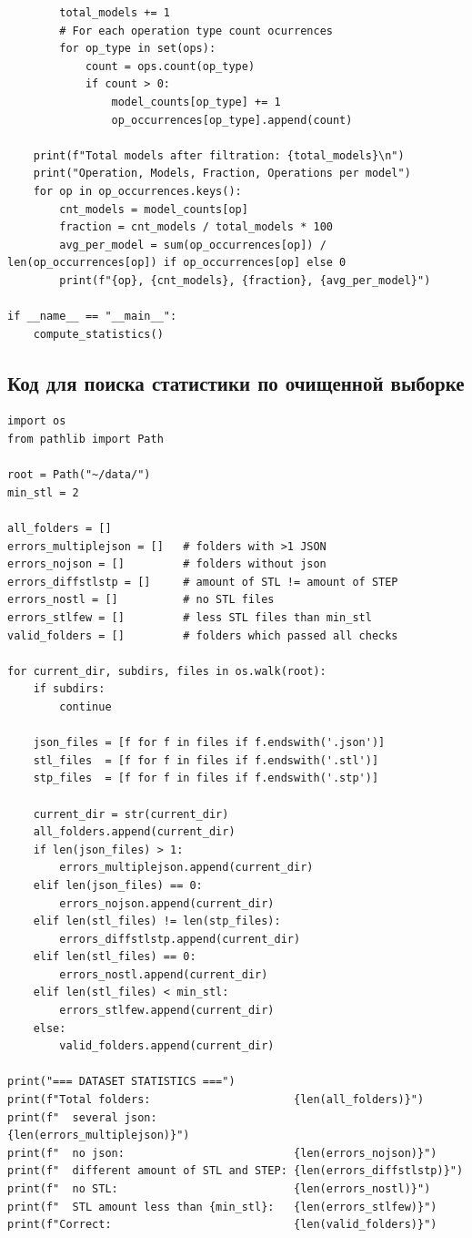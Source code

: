 \begin{lstlisting}
        total_models += 1
        # For each operation type count ocurrences
        for op_type in set(ops):
            count = ops.count(op_type)
            if count > 0:
                model_counts[op_type] += 1
                op_occurrences[op_type].append(count)
    
    print(f"Total models after filtration: {total_models}\n")
    print("Operation, Models, Fraction, Operations per model")
    for op in op_occurrences.keys():
        cnt_models = model_counts[op]
        fraction = cnt_models / total_models * 100
        avg_per_model = sum(op_occurrences[op]) / len(op_occurrences[op]) if op_occurrences[op] else 0
        print(f"{op}, {cnt_models}, {fraction}, {avg_per_model}")

if __name__ == "__main__":
    compute_statistics()
\end{lstlisting}



\subsection{Код для поиска статистики по очищенной выборке}

\begin{lstlisting}
import os
from pathlib import Path

root = Path("~/data/")
min_stl = 2

all_folders = []
errors_multiplejson = []   # folders with >1 JSON
errors_nojson = []         # folders without json
errors_diffstlstp = []     # amount of STL != amount of STEP
errors_nostl = []          # no STL files
errors_stlfew = []         # less STL files than min_stl
valid_folders = []         # folders which passed all checks

for current_dir, subdirs, files in os.walk(root):
    if subdirs:
        continue

    json_files = [f for f in files if f.endswith('.json')]
    stl_files  = [f for f in files if f.endswith('.stl')]
    stp_files  = [f for f in files if f.endswith('.stp')]

    current_dir = str(current_dir)
    all_folders.append(current_dir)
    if len(json_files) > 1:
        errors_multiplejson.append(current_dir)
    elif len(json_files) == 0:
        errors_nojson.append(current_dir)
    elif len(stl_files) != len(stp_files):
        errors_diffstlstp.append(current_dir)
    elif len(stl_files) == 0:
        errors_nostl.append(current_dir)
    elif len(stl_files) < min_stl:
        errors_stlfew.append(current_dir)
    else:
        valid_folders.append(current_dir)

print("=== DATASET STATISTICS ===")
print(f"Total folders:                      {len(all_folders)}")
print(f"  several json:                     {len(errors_multiplejson)}")
print(f"  no json:                          {len(errors_nojson)}")
print(f"  different amount of STL and STEP: {len(errors_diffstlstp)}")
print(f"  no STL:                           {len(errors_nostl)}")
print(f"  STL amount less than {min_stl}:   {len(errors_stlfew)}")
print(f"Correct:                            {len(valid_folders)}")
\end{lstlisting}

